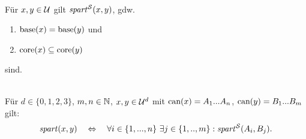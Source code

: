 
\begin{dfn}[$\Gspart^\einf$]\ \\ 
    Für $x,y \in \mathcal{U}$ gilt $\mathit{spart}^{\mathcal{S}}(x,y)$, gdw.
    \begin{enumerate}
        \item $\text{base}(x) = \text{base}(y)$ und
        \item $\text{core}(x) \subseteq \text{core}(y)$
    \end{enumerate}
    sind.
\end{dfn}


\begin{dfn}[$\Gspart$]\ \\
    Für $d \in \{0,1,2,3\}$, $m,n \in \mathbb{N}$, $x,y \in \mathcal{U}^d$ mit $\text{can}(x) = A_1 ... A_n$, $\text{can}(y) = B_1 ... B_m$ gilt:
    $$\mathit{spart}(x,y) \quad \Leftrightarrow \quad \forall i \in \{1, ..., n\}\ \exists j \in \{1, .., m\}: \mathit{spart}^{\mathcal{S}}(A_i,B_j). $$
\end{dfn}


